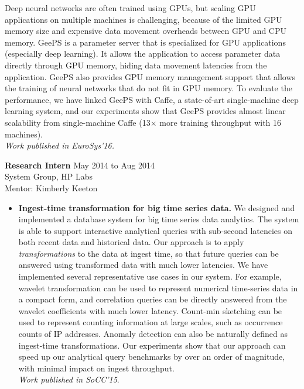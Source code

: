 \documentclass[10pt]{article}
\newenvironment{innerlist}[1][\enskip\textbullet]%
        {\begin{itemize}[#1,leftmargin=*,parsep=0pt,itemsep=0pt,topsep=0pt,partopsep=0pt]}
        {\end{itemize}}
\newcommand{\halfblankline}{\quad\vspace{-0.5\baselineskip}\pagebreak[3]}
\begin{document}
\begin{innerlist}
    Deep neural networks are often trained using GPUs, but scaling GPU applications on multiple machines is challenging, because of the limited GPU memory size and expensive data movement overheads between GPU and CPU memory. GeePS is a parameter server that is specialized for GPU applications (especially deep learning). It allows the application to access parameter data directly through GPU memory, hiding data movement latencies from the application. GeePS also provides GPU memory management support that allows the training of neural networks that do not fit in GPU memory. To evaluate the performance, we have linked GeePS with Caffe, a state-of-art single-machine deep learning system, and our experiments show that GeePS provides almost linear scalability from single-machine Caffe (13$\times$ more training throughput with 16 machines). \\
    \emph{Work published in EuroSys'16.}
\end{innerlist}

\halfblankline

\textbf{Research Intern} \hfill {May 2014 to Aug 2014}\\
System Group, HP Labs\\
Mentor: Kimberly Keeton
\begin{innerlist}
\item[] {\bf Ingest-time transformation for big time series data.}
    We designed and implemented a database system for big time series data analytics.
    The system is able to support interactive analytical queries
    with sub-second latencies on both recent data and historical data.
    Our approach is to apply \emph{transformations} to the data at ingest time,
    so that future queries can be answered using transformed data with much lower latencies.
    We have implemented several representative use cases in our system.
    For example, wavelet transformation can be used to
    represent numerical time-series data in a compact form,
    and correlation queries can be directly answered
    from the wavelet coefficients with much lower latency.
    Count-min sketching can be used to represent counting information at large scales,
    such as occurrence counts of IP addresses.
    Anomaly detection can also be naturally defined as ingest-time transformations.
    Our experiments show that our approach can speed up our analytical query benchmarks
    by over an order of magnitude, with minimal impact on ingest throughput. \\
    \emph{Work published in SoCC'15}.
\end{innerlist}
\end{document}
